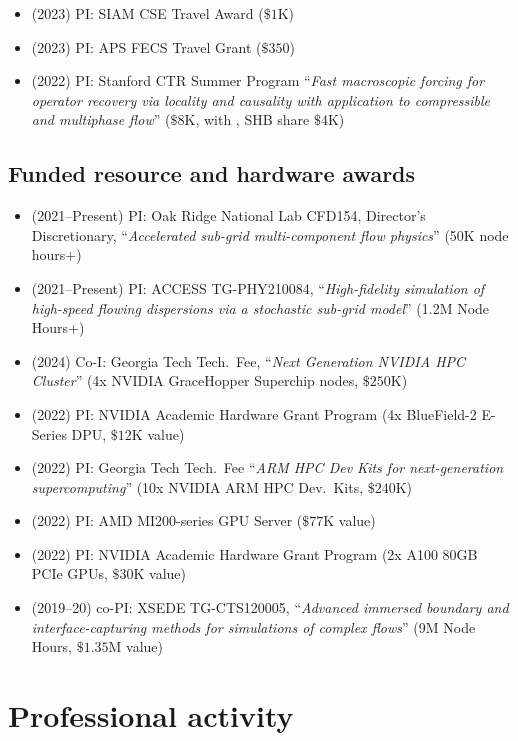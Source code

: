 \begin{itemize}
    \item (2023) PI: SIAM CSE Travel Award ($\$1$K)
    \item (2023) PI: APS FECS Travel Grant ($\$350$)
    \item (2022) PI: Stanford CTR Summer Program ``\textit{Fast macroscopic forcing for operator recovery via locality and causality with application to compressible and multiphase flow}'' ($\$8$K, with \Florian, SHB share $\$4$K)
\end{itemize}

\subsection{Funded resource and hardware awards}

\begin{itemize}
    \item (2021--Present) PI: Oak Ridge National Lab CFD154, Director's Discretionary, ``\textit{Accelerated sub-grid multi-component flow physics}'' (50K node hours+)
    \item (2021--Present) PI: ACCESS TG-PHY210084, ``\textit{High-fidelity simulation of high-speed flowing dispersions via a stochastic sub-grid model}'' (1.2M Node Hours+)
    \item (2024) Co-I: Georgia Tech Tech.\ Fee, ``\textit{Next Generation NVIDIA HPC Cluster}'' (4x NVIDIA GraceHopper Superchip nodes, $\$250$K)
    \item (2022) PI: NVIDIA Academic Hardware Grant Program (4x BlueField-2 E-Series DPU, $\$12$K value)
    \item (2022) PI: Georgia Tech Tech.\ Fee ``\textit{ARM HPC Dev Kits for next-generation supercomputing}'' (10x NVIDIA ARM HPC Dev.\ Kits, $\$240$K)
    \item (2022) PI: AMD MI200-series GPU Server ($\$77$K value)
    \item (2022) PI: NVIDIA Academic Hardware Grant Program (2x A100 80GB PCIe GPUs, $\$30$K value)
    \item (2019--20) co-PI: XSEDE TG-CTS120005, ``\textit{Advanced immersed boundary and interface-capturing methods for simulations of complex flows}'' (9M Node Hours, $\$1.35$M value)
\end{itemize}

% 

\section{Professional activity}

